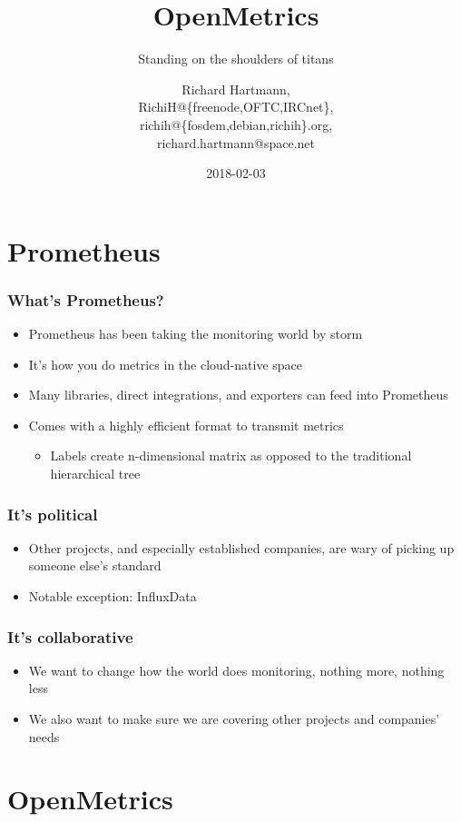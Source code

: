 \documentclass[t]{beamer}
\title{OpenMetrics}
\subtitle{Standing on the shoulders of titans}
\author{Richard Hartmann,\\
RichiH@\{freenode,OFTC,IRCnet\},\\
richih@\{fosdem,debian,richih\}.org,\\
richard.hartmann@space.net}
\date{2018-02-03}
\begin{document}
\setcounter{tocdepth}{1}

\begin{frame}
	\titlepage
\end{frame}


\section{Prometheus}

\begin{frame}
	\frametitle{What's Prometheus?}
	\begin{itemize}
		\item Prometheus has been taking the monitoring world by storm
		\item It's how you do metrics in the cloud-native space
		\item Many libraries, direct integrations, and exporters can feed into Prometheus
		\item Comes with a highly efficient format to transmit metrics
		\begin{itemize}
			\item Labels create n-dimensional matrix as opposed to the traditional hierarchical tree
		\end{itemize}
	\end{itemize}
\end{frame}

\begin{frame}
	\frametitle{It's political}
	\begin{itemize}
		\item Other projects, and especially established companies, are wary of picking up someone else's standard
		\item Notable exception: InfluxData
	\end{itemize}
\end{frame}

\begin{frame}
	\frametitle{It's collaborative}
	\begin{itemize}
		\item We want to change how the world does monitoring, nothing more, nothing less
		\item We also want to make sure we are covering other projects and companies' needs
	\end{itemize}
\end{frame}


\section{OpenMetrics}
\end{document}
